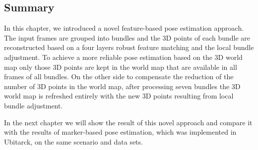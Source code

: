\subsection{Summary} \label{subsec:summary}

In this chapter, we introduced a novel feature-based pose estimation approach. The input frames are grouped into bundles and the 3D points of each bundle are reconstructed based on a four layers robust feature matching and the local bundle adjustment. To achieve a more reliable pose estimation based on the 3D world map only those 3D points are kept in the world map that are available in all frames of all bundles. On the other side to compensate the reduction of the number of 3D points in the world map, after processing seven bundles the 3D world map is refreshed entirely with the new 3D points resulting from local bundle adjustment. 


In the next chapter we will show the result of this novel approach and compare it with the results of marker-based pose estimation, which was implemented in Ubitarck, on the same scenario and data sets.
